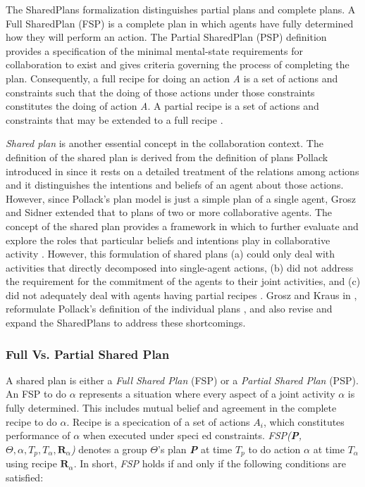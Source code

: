 \documentclass[11pt]{article}
\begin{document}
The SharedPlans formalization distinguishes partial plans and complete plans. A
Full SharedPlan (FSP) is a complete plan in which agents have fully determined
how they will perform an action. The Partial SharedPlan (PSP) definition
provides a specification of the minimal mental-state requirements for
collaboration to exist and gives criteria governing the process of completing
the plan. Consequently, a full recipe for doing an action \textit{A} is a set of
actions and constraints such that the doing of those actions under those
constraints constitutes the doing of action \textit{A}. A partial recipe is a
set of actions and constraints that may be extended to a full recipe
\cite{grosz:planning-acting}.

\textit{Shared plan} is another essential concept in the collaboration context.
The definition of the shared plan is derived from the definition of plans
Pollack introduced in \cite{pollack:plan-inference,
pollack:plan-mental-attitudes} since it rests on a detailed treatment of the
relations among actions and it distinguishes the intentions and beliefs of an
agent about those actions. However, since Pollack's plan model is just a simple
plan of a single agent, Grosz and Sidner extended that to plans of two or more
collaborative agents. The concept of the shared plan provides a framework in
which to further evaluate and explore the roles that particular beliefs and
intentions play in collaborative activity \cite{lochbaum:plan-models}. However,
this formulation of shared plans (a) could only deal with activities that
directly decomposed into single-agent actions, (b) did not address the
requirement for the commitment of the agents to their joint activities, and (c)
did not adequately deal with agents having partial recipes
\cite{grosz:collaboration}. Grosz and Kraus in \cite{grosz:collaboration},
reformulate Pollack's definition of the individual plans
\cite{pollack:plan-mental-attitudes}, and also revise and expand the SharedPlans
to address these shortcomings.

\subsubsection{Full Vs. Partial Shared Plan}
\label{sec:full-partial-plan}

A shared plan is either a \textit{Full Shared Plan} (FSP) or a \textit{Partial
Shared Plan} (PSP). An FSP to do $\alpha$ represents a situation where every
aspect of a joint activity $\alpha$ is fully determined. This includes mutual
belief and agreement in the complete recipe to do $\alpha$. Recipe is a
specication of a set of actions \textit{$A_i$}, which constitutes performance of
$\alpha$ when executed under speci ed constraints. \textit{FSP(\textbf{P},
$\Theta, \alpha, T_p, T_\alpha, \textbf{R}_\alpha$)} denotes a group $\Theta$'s
plan \textit{\textbf{P}} at time \textit{$T_p$} to do action $\alpha$ at time
\textit{$T_\alpha$} using recipe \textit{$\textbf{R}_\alpha$}. In short,
\textit{FSP} holds if and only if the following conditions are satisfied:
\end{document}
